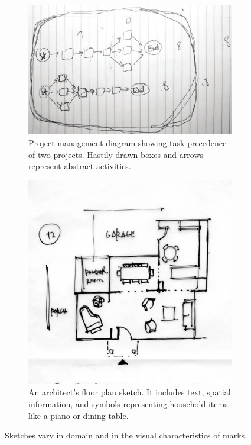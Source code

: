 \begin{figure}
  \centering
  \begin{subfigure}[b]{0.42\textwidth}
    \includegraphics[width=\linewidth]{img/sketch-type-project-management.pdf}
    \caption{Project management diagram showing task precedence of two
      projects. Hastily drawn boxes and arrows represent abstract
      activities.}
    \label{fig:sketch-type-pm}
  \end{subfigure}
  \hspace{1cm}
  \begin{subfigure}[b]{0.42\textwidth}
    \includegraphics[width=\linewidth]{img/sketch-type-architecture.pdf}
    \caption{An architect's floor plan sketch. It includes text, 
      spatial information, and symbols representing household
      items like a piano or dining table.}
    \label{fig:sketch-type-architecture}
  \end{subfigure}
  
  \caption[Project management and Architecture sketches]{Sketches vary
    in domain and in the visual characteristics of marks.}
  \label{fig:types-of-sketches}

\end{figure}
